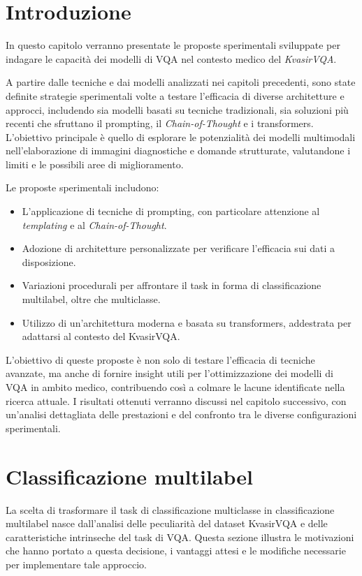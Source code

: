 \documentclass[../main.tex]{subfiles}
\begin{document}
\section{Introduzione}

In questo capitolo verranno presentate le proposte sperimentali sviluppate per indagare le capacità dei modelli di VQA nel contesto medico del \textit{KvasirVQA}. 

A partire dalle tecniche e dai modelli analizzati nei capitoli precedenti, sono state definite strategie sperimentali volte a testare l'efficacia di diverse architetture e approcci, includendo sia modelli basati su tecniche tradizionali, sia soluzioni più recenti che sfruttano il prompting, il \textit{Chain-of-Thought} e i transformers. 
L'obiettivo principale è quello di esplorare le potenzialità dei modelli multimodali nell'elaborazione di immagini diagnostiche e domande strutturate, valutandone i limiti e le possibili aree di miglioramento.

Le proposte sperimentali includono:
\begin{itemize}
    \item L'applicazione di tecniche di prompting, con particolare attenzione al \textit{templating} e al \textit{Chain-of-Thought}.
    \item Adozione di architetture personalizzate per verificare l'efficacia sui dati a disposizione.
    \item Variazioni procedurali per affrontare il task in forma di classificazione multilabel, oltre che multiclasse.
    \item Utilizzo di un'architettura moderna e basata su transformers, addestrata per adattarsi al contesto del KvasirVQA.
\end{itemize}

L'obiettivo di queste proposte è non solo di testare l'efficacia di tecniche avanzate, ma anche di fornire insight utili per l'ottimizzazione dei modelli di VQA in ambito medico, contribuendo così a colmare le lacune identificate nella ricerca attuale.
I risultati ottenuti verranno discussi nel capitolo successivo, con un'analisi dettagliata delle prestazioni e del confronto tra le diverse configurazioni sperimentali.

\section{Classificazione multilabel}

La scelta di trasformare il task di classificazione multiclasse in classificazione multilabel nasce dall'analisi delle peculiarità del dataset KvasirVQA e delle caratteristiche intrinseche del task di VQA. 
Questa sezione illustra le motivazioni che hanno portato a questa decisione, i vantaggi attesi e le modifiche necessarie per implementare tale approccio.
\end{document}
